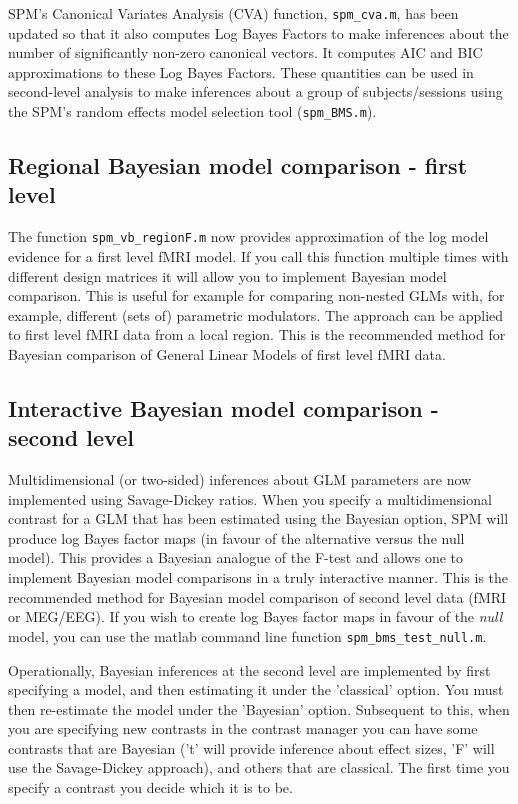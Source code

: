 \documentclass[a4paper,titlepage,openany]{article}
\begin{document}
\begin{multicols}{2}
SPM's Canonical Variates Analysis (CVA) function, \texttt{spm\_cva.m}, has been updated so that it also computes Log Bayes Factors to make inferences about the number of significantly non-zero canonical vectors. It computes AIC and BIC approximations to these Log Bayes Factors. These quantities can be used in second-level analysis to make inferences about a group of subjects/sessions using the SPM's random effects model selection tool (\texttt{spm\_BMS.m}).

\subsection{Regional Bayesian model comparison - first level}

The function \texttt{spm\_vb\_regionF.m} now provides approximation of the log model evidence for a first level fMRI model. If you call this function multiple times with different design matrices it will allow you to implement Bayesian model comparison. This is useful for example for comparing non-nested GLMs with, for example, different (sets of) parametric modulators. The approach can be applied to first level fMRI data from a local region. This is the recommended method for Bayesian comparison of General Linear Models of first level fMRI data.

\subsection{Interactive Bayesian model comparison - second level}

Multidimensional (or two-sided) inferences about GLM parameters  are now implemented using Savage-Dickey ratios.  When you specify a multidimensional contrast for a GLM that has been estimated using the Bayesian option, SPM will produce log Bayes factor maps (in favour of the alternative versus the null model). This provides a Bayesian analogue of the F-test and allows one to implement Bayesian model comparisons in a truly interactive manner.
This is the recommended method for Bayesian model comparison of second level data (fMRI or MEG/EEG). If you wish to create log Bayes factor maps in favour of the {\em null} model, you can use the matlab command line function \verb!spm_bms_test_null.m!.

Operationally, Bayesian inferences at the second level are implemented by first specifying a model, and then estimating it under the 'classical' option. You must then re-estimate the model under the 'Bayesian' option. Subsequent to this, when you are specifying new contrasts in the contrast manager you can have some contrasts that are Bayesian ('t' will provide inference about effect sizes, 'F' will use the Savage-Dickey approach), and others that are classical. The first time you specify a contrast you decide which it is to be.




\end{multicols}
\end{document}
